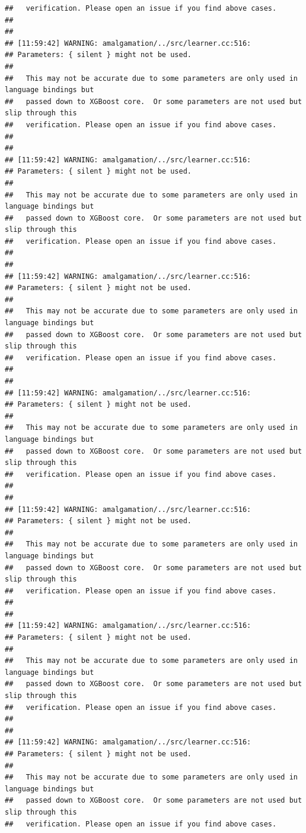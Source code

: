 \documentclass[AMS,STIX2COL]{WileyNJD-v2}\usepackage[]{graphicx}\usepackage[]{color}
\makeatletter
\newenvironment{kframe}{%
 \def\at@end@of@kframe{}%
 \ifinner\ifhmode%
  \def\at@end@of@kframe{\end{minipage}}%
  \begin{minipage}{\columnwidth}%
 \fi\fi%
 \def\FrameCommand##1{\hskip\@totalleftmargin \hskip-\fboxsep
 \colorbox{shadecolor}{##1}\hskip-\fboxsep
     \hskip-\linewidth \hskip-\@totalleftmargin \hskip\columnwidth}%
 \MakeFramed {\advance\hsize-\width
   \@totalleftmargin\z@ \linewidth\hsize
   \@setminipage}}%
 {\par\unskip\endMakeFramed%
 \at@end@of@kframe}
\newenvironment{knitrout}{}{} %
\makeatother
\begin{document}
\begin{knitrout}
\begin{kframe}
\begin{verbatim}
##   verification. Please open an issue if you find above cases.
## 
## 
## [11:59:42] WARNING: amalgamation/../src/learner.cc:516: 
## Parameters: { silent } might not be used.
## 
##   This may not be accurate due to some parameters are only used in language bindings but
##   passed down to XGBoost core.  Or some parameters are not used but slip through this
##   verification. Please open an issue if you find above cases.
## 
## 
## [11:59:42] WARNING: amalgamation/../src/learner.cc:516: 
## Parameters: { silent } might not be used.
## 
##   This may not be accurate due to some parameters are only used in language bindings but
##   passed down to XGBoost core.  Or some parameters are not used but slip through this
##   verification. Please open an issue if you find above cases.
## 
## 
## [11:59:42] WARNING: amalgamation/../src/learner.cc:516: 
## Parameters: { silent } might not be used.
## 
##   This may not be accurate due to some parameters are only used in language bindings but
##   passed down to XGBoost core.  Or some parameters are not used but slip through this
##   verification. Please open an issue if you find above cases.
## 
## 
## [11:59:42] WARNING: amalgamation/../src/learner.cc:516: 
## Parameters: { silent } might not be used.
## 
##   This may not be accurate due to some parameters are only used in language bindings but
##   passed down to XGBoost core.  Or some parameters are not used but slip through this
##   verification. Please open an issue if you find above cases.
## 
## 
## [11:59:42] WARNING: amalgamation/../src/learner.cc:516: 
## Parameters: { silent } might not be used.
## 
##   This may not be accurate due to some parameters are only used in language bindings but
##   passed down to XGBoost core.  Or some parameters are not used but slip through this
##   verification. Please open an issue if you find above cases.
## 
## 
## [11:59:42] WARNING: amalgamation/../src/learner.cc:516: 
## Parameters: { silent } might not be used.
## 
##   This may not be accurate due to some parameters are only used in language bindings but
##   passed down to XGBoost core.  Or some parameters are not used but slip through this
##   verification. Please open an issue if you find above cases.
## 
## 
## [11:59:42] WARNING: amalgamation/../src/learner.cc:516: 
## Parameters: { silent } might not be used.
## 
##   This may not be accurate due to some parameters are only used in language bindings but
##   passed down to XGBoost core.  Or some parameters are not used but slip through this
##   verification. Please open an issue if you find above cases.

\end{verbatim}
\end{kframe}
\end{knitrout}
\end{document}
